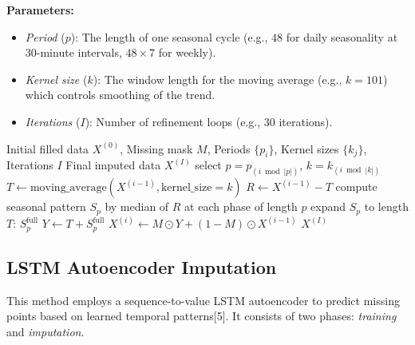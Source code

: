 \documentclass[10pt,twocolumn]{article}
\begin{document}
	\textbf{Parameters:}
	\begin{itemize}
		\item \emph{Period} ($p$): The length of one seasonal cycle (e.g., $48$ for daily seasonality at 30-minute intervals, $48 \times 7$ for weekly).
		\item \emph{Kernel size} ($k$): The window length for the moving average (e.g., $k=101$) which controls smoothing of the trend.
		\item \emph{Iterations} ($I$): Number of refinement loops (e.g., $30$ iterations).
	\end{itemize}
	
	\begin{algorithm}[H]
		\caption{GPU-Accelerated STL Imputation}
		\begin{algorithmic}[1]
			\Require Initial filled data $X^{(0)}$, Missing mask $M$, Periods $\{p_i\}$, Kernel sizes $\{k_j\}$, Iterations $I$
			\Ensure Final imputed data $X^{(I)}$
			\State select $p = p_{(i \bmod |p|)}$, $k = k_{(i \bmod |k|)}$
			\State $T \gets \text{moving\_average}(X^{(i-1)}, \text{kernel\_size}=k)$
			\State $R \gets X^{(i-1)} - T$  
			\State compute seasonal pattern $S_p$ by median of $R$ at each phase of length $p$
			\State expand $S_p$ to length $T$: $S_p^{\mathrm{full}}$
			\State $Y \gets T + S_p^{\mathrm{full}}$
			\State $X^{(i)} \gets M \odot Y + (1 - M) \odot X^{(i-1)}$
			\EndFor
			\State \Return $X^{(I)}$
		\end{algorithmic}
	\end{algorithm}
	
	\subsection{LSTM Autoencoder Imputation}
	This method employs a sequence-to-value LSTM autoencoder to predict missing points based on learned temporal patterns[5]. It consists of two phases: \textit{training} and \textit{imputation}.
	\paragraph{}
\end{document}
